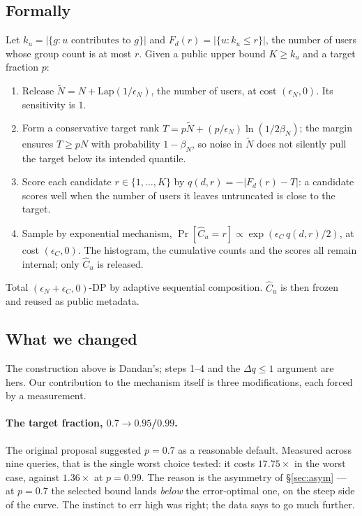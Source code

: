 \documentclass[11pt,a4paper]{article}
\newcommand{\Cu}{C_u}
\newcommand{\ku}{k_u}
\begin{document}
\subsection{Formally}

Let $\ku = |\{g : u \text{ contributes to } g\}|$ and $F_d(r) = |\{u : \ku \le r\}|$, the number of
users whose group count is at most $r$. Given a public upper bound $K \ge \ku$ and a target
fraction $p$:

\begin{enumerate}
\item Release $\tilde N = N + \mathrm{Lap}(1/\epsilon_N)$, the number of users, at cost
$(\epsilon_N, 0)$. Its sensitivity is $1$.
\item Form a conservative target rank $T = p\tilde N + (p/\epsilon_N)\ln(1/2\beta_N)$; the margin
ensures $T \ge pN$ with probability $1-\beta_N$, so noise in $\tilde N$ does not silently pull the
target below its intended quantile.
\item Score each candidate $r \in \{1,\dots,K\}$ by $q(d,r) = -|F_d(r) - T|$: a candidate scores
well when the number of users it leaves untruncated is close to the target.
\item Sample by exponential mechanism, $\Pr[\hat\Cu = r] \propto \exp(\epsilon_C\, q(d,r)/2)$, at
cost $(\epsilon_C, 0)$. The histogram, the cumulative counts and the scores all remain internal;
only $\hat\Cu$ is released.
\end{enumerate}

Total $(\epsilon_N + \epsilon_C, 0)$-DP by adaptive sequential composition. $\hat\Cu$ is then
frozen and reused as public metadata.

\subsection{What we changed}

The construction above is Dandan's; steps 1--4 and the $\Delta q \le 1$ argument are hers. Our
contribution to the mechanism itself is three modifications, each forced by a measurement.

\paragraph{The target fraction, $0.7 \to 0.95$/$0.99$.} The original proposal suggested
$p = 0.7$ as a reasonable default. Measured across nine queries, that is the single worst choice
tested: it costs $17.75\times$ in the worst case, against $1.36\times$ at $p = 0.99$. The reason is
the asymmetry of \S\ref{sec:asym} --- at $p = 0.7$ the selected bound lands \emph{below} the
error-optimal one, on the steep side of the curve. The instinct to err high was right; the data
says to go much further.
\end{document}
